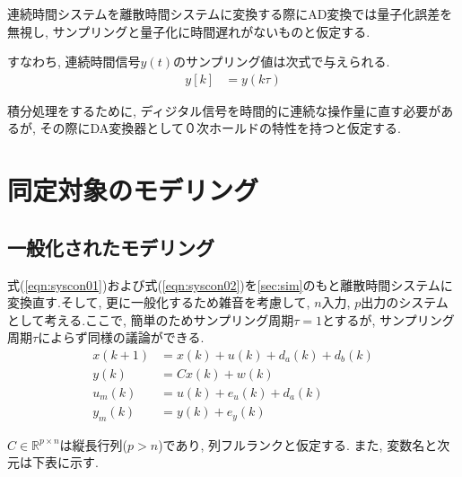 \documentclass[a4paper,12pt]{jbook}
\begin{document}
連続時間システムを離散時間システムに変換する際にAD変換では量子化誤差を無視し, サンプリングと量子化に時間遅れがないものと仮定する.

すなわち, 連続時間信号$y(t)$のサンプリング値は次式で与えられる.
\begin{align}
 y[k] &= y(kτ) \label{eqn:sample}
\end{align}

積分処理をするために, ディジタル信号を時間的に連続な操作量に直す必要があるが, その際にDA変換器として０次ホールドの特性を持つと仮定する.

\chapter{同定対象のモデリング}
\section{一般化されたモデリング}
式(\ref{eqn:syscon01})および式(\ref{eqn:syscon02})を\ref{sec:sim}のもと離散時間システムに変換直す.そして, 更に一般化するため雑音を考慮して, $n$入力, $p$出力のシステムとして考える.ここで, 簡単のためサンプリング周期$τ=1$とするが, サンプリング周期$τ$によらず同様の議論ができる.
\begin{align}
 x(k+1) &= x(k) + u(k) + d_a(k) +d_b(k) \label{eqn:sys01} \\
 y(k) &= C x(k) + w(k) \label{eqn:sys02}\\
 u_m(k) &= u(k) + e_u(k) + d_a(k) \label{eqn:sys03}\\
 y_m(k) &= y(k) + e_y(k) \label{eqn:sys04}
\end{align}


$C \in \mathbb{R}^{p\times n}$は縦長行列($p > n$)であり, 列フルランクと仮定する.
また, 変数名と次元は下表に示す.\\
\end{document}
